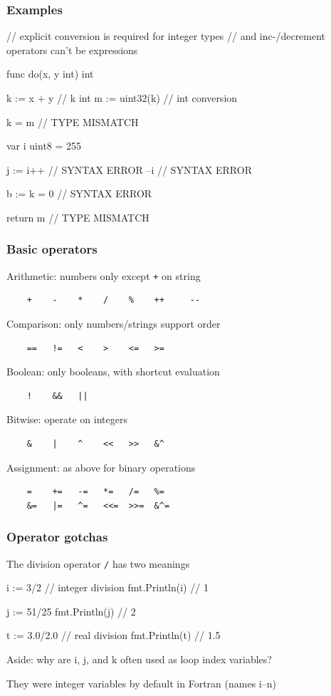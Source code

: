\documentclass[handout,compress,t,11pt]{beamer}
\begin{document}
\begin{frame}[fragile]
    \frametitle{Examples}
\begin{golang}
// explicit conversion is required for integer types
// and inc-/decrement operators can't be expressions

func do(x, y int) int {
    k := x + y              // k int
    m := uint32(k)          // int conversion

    k = m                   // TYPE MISMATCH

    var i uint8 = 255

    j := i++                // SYNTAX ERROR
    --i                     // SYNTAX ERROR

    b := k = 0              // SYNTAX ERROR

    return m                // TYPE MISMATCH
}
\end{golang}
\end{frame}

\begin{frame}[fragile]
    \frametitle{Basic operators}
    Arithmetic: numbers only except \verb|+| on string
{\scriptsize\begin{verbatim}
    +    -    *    /    %    ++     --
\end{verbatim}}
    Comparison: only numbers/strings support order
{\scriptsize\begin{verbatim}
    ==   !=   <    >    <=   >=
\end{verbatim}}
    Boolean: only booleans, with shortcut evaluation
{\scriptsize\begin{verbatim}
    !    &&   ||
\end{verbatim}}
    Bitwise: operate on integers
{\scriptsize\begin{verbatim}
    &    |    ^    <<   >>   &^
\end{verbatim}}
    Assignment: as above for binary operations
{\scriptsize\begin{verbatim}
    =    +=   -=   *=   /=   %=
    &=   |=   ^=   <<=  >>=  &^=
\end{verbatim}}
\end{frame}

\begin{frame}[fragile]
    \frametitle{Operator gotchas}
    The division operator \verb|/| has two meanings
\begin{golang}
    i := 3/2          // integer division
    fmt.Println(i)    // 1

    j := 51/25
    fmt.Println(j)    // 2

    t := 3.0/2.0      // real division
    fmt.Println(t)    // 1.5
\end{golang}
    \vspace{3\baselineskip}
    Aside: why are i, j, and k often used as loop index variables? \par
    \vspace{0.2\baselineskip}
    They were integer variables by default in Fortran (names i--n)
\end{frame}
\end{document}
